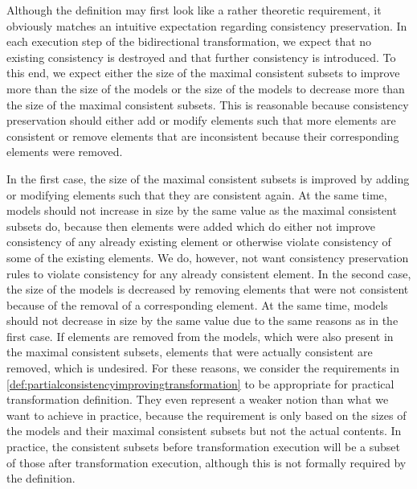Although the definition may first look like a rather theoretic requirement, it obviously matches an intuitive expectation regarding consistency preservation.
In each execution step of the bidirectional transformation, we expect that no existing consistency is destroyed and that further consistency is introduced.
To this end, we expect either the size of the maximal consistent subsets to improve more than the size of the models or the size of the models to decrease more than the size of the maximal consistent subsets.
This is reasonable because consistency preservation should either add or modify elements such that more elements are consistent or remove elements that are inconsistent because their corresponding elements were removed.

In the first case, the size of the maximal consistent subsets is improved by adding or modifying elements such that they are consistent again.
At the same time, models should not increase in size by the same value as the maximal consistent subsets do, because then elements were added which do either not improve consistency of any already existing element or otherwise violate consistency of some of the existing elements.
We do, however, not want consistency preservation rules to violate consistency for any already consistent element.
In the second case, the size of the models is decreased by removing elements that were not consistent because of the removal of a corresponding element.
At the same time, models should not decrease in size by the same value due to the same reasons as in the first case.
If elements are removed from the models, which were also present in the maximal consistent subsets, elements that were actually consistent are removed, which is undesired.
For these reasons, we consider the requirements in \autoref{def:partialconsistencyimprovingtransformation} to be appropriate for practical transformation definition.
They even represent a weaker notion than what we want to achieve in practice, because the requirement is only based on the sizes of the models and their maximal consistent subsets but not the actual contents.
In practice, the consistent subsets before transformation execution will be a subset of those after transformation execution, although this is not formally required by the definition.

